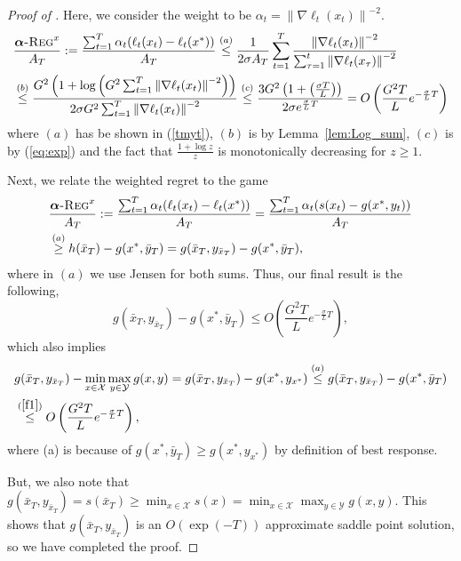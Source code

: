\documentclass[final,12pt]{colt2018} %
\def\balpha{\boldsymbol{\alpha}}
\newcommand{\norm}[1]{\left\lVert#1\right\rVert}
\newcommand{\norme}[1]{\norm{#1}}
\newcommand{\yx}[1]{y_{#1}}
\newcommand{\regret}[1]{\balpha\textsc{-Reg}^{#1}}
\newcommand{\XX}{\mathcal{X}}
\newcommand{\YY}{\mathcal{Y}}
\newcommand{\pr}[1]{\left(#1\right)}
\begin{document}
\begin{proof}[Proof of ]
Here, we consider the weight to be
$\alpha_t = \norme{\nabla \ell_t(x_t)}^{-2}$. 
\begin{equation}
\begin{aligned}
& \frac{ \regret{x} }{  A_T } :=
\frac{\sum_{t=1}^T \alpha_t(\ell_t (x_t) - \ell_t(x^*))}{A_T} 
\overset{(a)}{\le} \frac{1}{2\sigma A_T} \sum_{t=1}^T \frac{\norme{\nabla \ell_t(x_t)}^{-2}}{\sum_{\tau = 1}^t \norme{\nabla \ell_t(x_\tau)}^{-2}}\\
&\overset{(b)}{\le} \frac{G^2\pr{1 + \log \pr{G^2 \sum_{t=1}^T \norme{\nabla \ell_t(x_t)}^{-2}}}}{2\sigma G^2 \sum_{t=1}^{T} \norme{\nabla \ell_t(x_t)}^{-2}}
\overset{(c)}{\le} \frac{3 G^2\pr{1 + \pr{\frac{\sigma T}{L}}}}{2 \sigma e^{\frac{\sigma}{L}T}} = O\pr{\frac{G^2 T}{L}e^{-\frac{\sigma}{L}T}}
\end{aligned}
\end{equation}
where $(a)$ has be shown in (\ref{tmyt}), $(b)$ is by Lemma~\ref{lem:Log_sum}, $(c)$ is by (\ref{eq:exp}) and the fact that $\frac{1+\log z}{z}$ is monotonically decreasing for $z \ge 1$.


Next, we relate the weighted regret to the game
\begin{equation} \label{hereW}
\begin{aligned}
& \frac{ \regret{x} }{  A_T } :=
\frac{\sum_{t=1}^T \alpha_t(\ell_t (x_t) - \ell_t(x^*))}{A_T} 
= \frac{\sum_{t=1}^T \alpha_t(s(x_t) - g(x^*,y_t))}{A_T} 
\\ &\overset{(a)}{\ge} h(\bar{x}_T) - g(x^*,\bar{y}_T) = g(\bar{x}_T,\yx{\bar{x}_T})  - g(x^*,\bar{y}_T),
\end{aligned}
\end{equation}
where in $(a)$ we use Jensen for both sums.
Thus, our final result is the following,
\begin{equation} \label{f1}
g(\bar{x}_T,\yx{\bar{x}_T})  - g(x^*,\bar{y}_T) \le O\pr{\frac{G^2 T}{L}e^{-\frac{\sigma}{L}T}},
\end{equation}
which also implies
\begin{equation}
\begin{aligned}
& g(\bar{x}_T, \yx{\bar{x}_T}) - \min_{x \in \XX} \max_{y\in \YY} g(x,y) = g(\bar{x}_T, \yx{\bar{x}_T}) - g(x^*,\yx{x^*}) \overset{(a)}{\le} g(\bar{x}_T,\yx{\bar{x}_T}) - g(x^*,\bar{y}_T) 
\\ & \overset{(\ref{f1})}{\le} O\pr{\frac{G^2 T}{L}e^{-\frac{\sigma}{L}T}},
\end{aligned}
\end{equation}
where (a) is because of $g(x^*,\bar{y}_T) \geq g(x^*,\yx{x^*})$ by definition of best response.

But, we also note that $g(\bar{x}_T, \yx{\bar{x}_T}) = s(\bar{x}_T) \geq  \min_{x\in \XX} s(x) = \min_{x \in \XX} \max_{y \in \YY} g(x,y)$. This shows that $g(\bar{x}_T, \yx{\bar{x}_T})$ is an $O(\exp(-T))$ approximate saddle point solution, so we have completed the proof.



\end{proof}
\end{document}
